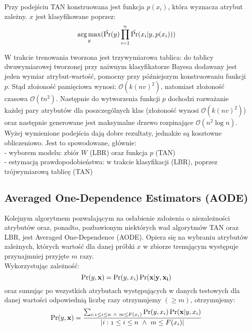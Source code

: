 \documentclass[16]{article}
\begin{document}
Przy podejściu TAN konstruowana jest funkcja $p(x_{i})$, która wyznacza atrybut zależny. $x$ jest klasyfikowane poprzez:
\begin{equation}
 \operatorname*{arg\,max}_\mathnormal{y} (\hat{\Pr}(\mathnormal{y}) \prod_{i=1}^{n} \hat{\Pr}(x_{i}|\mathnormal{y}, p(x_{i})))
\end{equation} 

W trakcie trenowania tworzona jest trzywymiarowa tablica: do tablicy dwuwymiarowej tworzonej przy naiwnym klasyfikatorze Bayesa dodawany jest jeden wymiar atrybut-wartość, pomocny przy późniejszym konstruowaniu funkcji $p$. Stąd złożoność pamięciowa wynosi: $\mathcal{O}(k(nv)^{2})$, natomiast złożoność czasowa $\mathcal{O}(tn^{2})$. Następnie do wytworzenia funkcji $p$ dochodzi rozważanie każdej pary atrybutów dla poszczególnych klas (złożoność wynosi $\mathcal{O}(k(nv)^{2})$) oraz następnie generowane jest maksymalne drzewo rozpinające $\mathcal{O}(n^{2} \log{n})$. \\

Wyżej wymienione podejścia dają dobre rezultaty, jednakże są kosztowne obliczeniowo. Jest to spowodowane, głównie:\\
- wyborem modelu: zbiór $W$ (LBR) oraz funkcja $p$ (TAN)\\
- estymacją prawdopodobieństwa:  w trakcie klasyfikacji (LBR), poprzez trójwymiarową tablicę (TAN) 

\subsection{Averaged One-Dependence Estimators (AODE)}
Kolejnym algorytmem pozwalającym na osłabienie założenia o niezależności atrybutów oraz, ponadto, pozbawionym niektórych wad algorytmów TAN oraz LBR, jest Averaged One-Dependence (AODE).
Opiera się na wybraniu atrybutów zależnych, których wartość dla danej próbki $x$ w zbiorze trenującym występuje przynajmniej przyjęte $m$ razy. \\

Wykorzystując zależność:
\begin{equation}
\Pr(\mathnormal{y},\bf{x})=\Pr(\mathnormal{y, x_{i}})\Pr(\mathnormal{\bf{x}|y, x_{i}})
\end{equation} 
oraz sumując po wszystkich atrybutach występujących w danych testowych dla danej wartości odpowiednią liczbę razy otrzymujemy $(\geq m)$, otrzymujemy:
\begin{equation}
\Pr(\mathnormal{y},\bf{x})=\frac{\sum_{\mathnormal{i:1 \leq i \leq n \ \wedge \ m \leq F(x_{i})} } \Pr(\mathnormal{y, x_{i}})\Pr(\mathnormal{\bf{x}|\mathnormal{y, x_{i}}})}{\mathnormal{|{i:1 \leq i \leq n \ \wedge \ m \leq F(x_{i})}|}}
\end{equation} 
\end{document}
